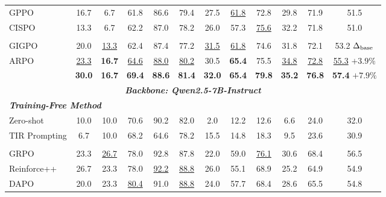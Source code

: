 \documentclass{article}
\begin{document}
\begin{table}[t]
{\begin{tabular}{cccccccccccc}
\multicolumn{1}{l}{GPPO} & 16.7 & 6.7 & 61.8 & 86.6 & \multicolumn{1}{c}{79.4} & 27.5 & \underline{61.8} & 72.8 & 29.8 & \multicolumn{1}{c}{71.9} & 51.5 \\
\multicolumn{1}{l}{CISPO} & 13.3 & 6.7 & 62.2 & 87.0 & \multicolumn{1}{c}{78.2} & 26.0 & 57.3 & \underline{75.6} & 32.2 & \multicolumn{1}{c}{71.8} & 51.0 \\ \hdashline
\multicolumn{12}{l}{\textbf{\textit{Agentic RL Method}}} \\
\multicolumn{1}{l}{GIGPO} & 20.0 & \underline{13.3} & 62.4 & 87.4 & \multicolumn{1}{c}{77.2} & \underline{31.5} & \underline{61.8} & 74.6 & 31.8 & \multicolumn{1}{c}{72.1} & 53.2 $\Delta_{\rm base}$\\
\multicolumn{1}{l}{ARPO} & \underline{23.3} & \textbf{16.7} & \underline{64.6} & \underline{88.0} & \multicolumn{1}{c}{\underline{80.2}} & 30.5 & \textbf{65.4} & 75.5 & \underline{34.8} & \multicolumn{1}{c}{\underline{72.8}} & \underline{55.3} \textcolor[rgb]{0,0.4,0}{\tiny $+3.9\%$}\\ 
\rowcolor{gray!20}
\multicolumn{1}{l}{\textbf{APPO (Ours)}} & \textbf{30.0} & \textbf{16.7} & \textbf{69.4}  & \textbf{88.6} & \multicolumn{1}{c}{\textbf{81.4}} & \textbf{32.0} & \textbf{65.4} & \textbf{79.8} & \textbf{35.2} & \multicolumn{1}{c}{\textbf{76.8}} & \textbf{57.4} \textcolor[rgb]{0,0.4,0}{\tiny $+7.9\%$}\\ \hline
\multicolumn{12}{c}{\textbf{\textit{Backbone: Qwen2.5-7B-Instruct}}} \\ \hline
\multicolumn{12}{l}{\textit{\textbf{Training-Free Method}}} \\
\multicolumn{1}{l}{Zero-shot} & 10.0 & 10.0 & 70.6 & 90.2 & \multicolumn{1}{c}{82.0} & 2.0 & 12.2 & 12.6 & 6.6 & \multicolumn{1}{c}{24.0} & 32.0 \\
\multicolumn{1}{l}{TIR Prompting} & 6.7 & 10.0 & 68.2 & 64.6 & \multicolumn{1}{c}{78.2} & 15.5 & 14.8 & 18.3 & 9.5 & \multicolumn{1}{c}{23.6} & 30.9 \\ \hdashline
\multicolumn{12}{l}{\textbf{\textit{Classic RL Method}}} \\
\multicolumn{1}{l}{GRPO} & 23.3 & \underline{26.7} & 78.0 & 92.8 & \multicolumn{1}{c}{87.8} & 22.0 & 59.0 & \underline{76.1} & 30.6 & \multicolumn{1}{c}{68.4} & 56.5 \\
\multicolumn{1}{l}{Reinforce++} & 26.7 & 23.3 & 78.0 & \underline{92.2} & \multicolumn{1}{c}{\underline{88.8}} & 26.0 & 55.1 & 68.9 & 25.2 & \multicolumn{1}{c}{64.9} & 54.9 \\
\multicolumn{1}{l}{DAPO} & 20.0 & 23.3 & \underline{80.4} & 91.0 & \multicolumn{1}{c}{\underline{88.8}} & 24.0 & 57.7 & 68.4 & 28.6 & \multicolumn{1}{c}{65.5} & 54.8 \\

\end{tabular}}
\end{table}
\end{document}
